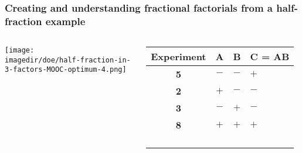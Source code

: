 \documentclass[handout,11pt,aspectratio=169,mathserif]{beamer}
\begin{document}
\begin{frame}\frametitle{{\large Creating and understanding fractional factorials from a half-fraction example}}
	\begin{columns}
			\begin{center}
				\texttt{[image: \\imagedir/doe/half-fraction-in-3-factors-MOOC-optimum-4.png]}
			\end{center}

			\begin{tabulary}{\linewidth}{cccl}\hline 
				\textsf{\relax Experiment } & \textbf{\relax A } & \textbf{\relax B } & \textbf{\relax C = AB } \\
				\hline 
				 \color{myOrange} \textbf{5} & \(-\) & \(-\) & \(+\) \\
				 \color{myOrange} \textbf{2} & \(+\) & \(-\) & \(-\) \\
				 \color{myOrange} \textbf{3} & \(-\) & \(+\) & \(-\) \\
				 \color{myOrange} \textbf{8} & \(+\) & \(+\) & \(+\) \\ \hline
				  & & & \\
				  & & & \\
				  & & & \\
				  & & & 
			\end{tabulary}
	\end{columns}	
\end{frame}
\end{document}
